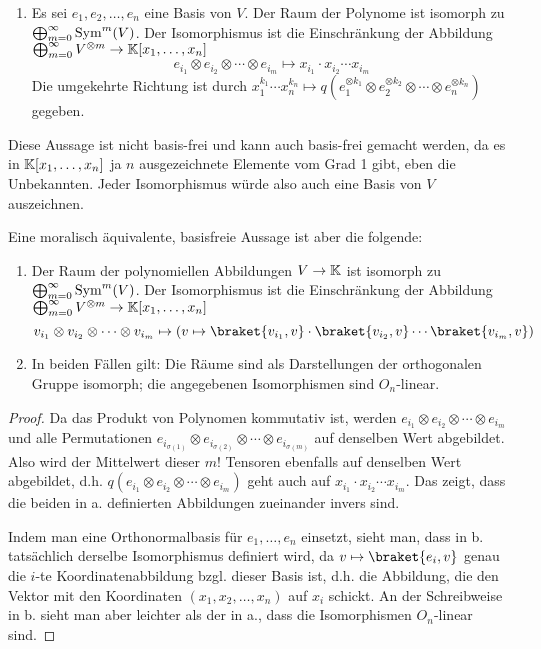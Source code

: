 \begin{theorem}
\begin{enumerate}
\item Es sei $e_1, e_2, \ldots, e_n$ eine Basis von $V$. Der Raum der Polynome ist isomorph zu $\bigoplus_{m=0}^\infty \operatorname{Sym}^m(V)$. Der Isomorphismus ist die Einschränkung der Abbildung $\bigoplus_{m=0}^\infty V^{\otimes m} \to \mathbb{K}[x_1,\ldots,x_n]$
\[e_{i_1} \otimes e_{i_2} \otimes \cdots \otimes e_{i_m} \mapsto x_{i_1}\cdot x_{i_2} \cdots x_{i_m}\]
Die umgekehrte Richtung ist durch $x_1^{k_1} \cdots x_n^{k_n} \mapsto q(e_1^{\otimes k_1} \otimes e_2^{\otimes k_2} \otimes \cdots \otimes e_n^{\otimes k_n})$ gegeben.
\end{enumerate}
Diese Aussage ist nicht basis-frei und kann auch basis-frei gemacht werden, da es in $\mathbb{K}[x_1, \ldots, x_n]$ ja $n$ ausgezeichnete Elemente vom Grad 1 gibt, eben die Unbekannten. Jeder Isomorphismus würde also auch eine Basis von $V$ auszeichnen.

Eine moralisch äquivalente, basisfreie Aussage ist aber die folgende:
\begin{enumerate}[resume]
\item Der Raum der polynomiellen Abbildungen $V\to\mathbb{K}$ ist isomorph zu $\bigoplus_{m=0}^\infty \operatorname{Sym}^m(V)$. Der Isomorphismus ist die Einschränkung der Abbildung $\bigoplus_{m=0}^\infty V^{\otimes m} \to \mathbb{K}[x_1,\ldots,x_n]$
\[v_{i_1} \otimes v_{i_2} \otimes \cdots \otimes v_{i_m} \mapsto (v\mapsto \braket{v_{i_1},v} \cdot \braket{v_{i_2},v} \cdots \braket{v_{i_m},v}) \]
\item In beiden Fällen gilt: Die Räume sind als Darstellungen der orthogonalen Gruppe isomorph; die angegebenen Isomorphismen sind $O_n$-linear.
\end{enumerate}
\end{theorem}
\begin{proof}
Da das Produkt von Polynomen kommutativ ist, werden $e_{i_1} \otimes e_{i_2} \otimes \cdots \otimes e_{i_m}$ und alle Permutationen $e_{i_{\sigma(1)}} \otimes e_{i_{\sigma(2)}} \otimes \cdots \otimes e_{i_{\sigma(m)}}$ auf denselben Wert abgebildet. Also wird der Mittelwert dieser $m!$ Tensoren ebenfalls auf denselben Wert abgebildet, d.h. $q(e_{i_1} \otimes e_{i_2} \otimes \cdots \otimes e_{i_m})$ geht auch auf $x_{i_1}\cdot x_{i_2} \cdots x_{i_m}$. Das zeigt, dass die beiden in a. definierten Abbildungen zueinander invers sind.

Indem man eine Orthonormalbasis für $e_1, \ldots, e_n$ einsetzt, sieht man, dass in b. tatsächlich derselbe Isomorphismus definiert wird, da $v\mapsto \braket{e_i, v}$ genau die $i$-te Koordinatenabbildung bzgl. dieser Basis ist, d.h. die Abbildung, die den Vektor mit den Koordinaten $(x_1, x_2, \ldots, x_n)$ auf $x_i$ schickt. An der Schreibweise in b. sieht man aber leichter als der in a., dass die Isomorphismen $O_n$-linear sind. 
\end{proof}
